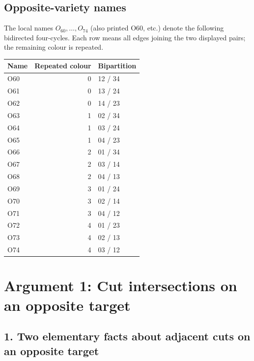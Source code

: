 \documentclass[
  10pt,
]{article}
\begin{document}
\hypertarget{opposite-variety-names}{%
\subsection{Opposite-variety names}\label{opposite-variety-names}}

The local names \(O_{60},\ldots,O_{74}\) (also printed O60, etc.) denote
the following bidirected four-cycles. Each row means all edges joining
the two displayed pairs; the remaining colour is repeated.

\begin{longtable}[]{@{}lrl@{}}
\toprule\noalign{}
Name & Repeated colour & Bipartition \\
\midrule\noalign{}
\endhead
\bottomrule\noalign{}
\endlastfoot
O60 & 0 & 12 / 34 \\
O61 & 0 & 13 / 24 \\
O62 & 0 & 14 / 23 \\
O63 & 1 & 02 / 34 \\
O64 & 1 & 03 / 24 \\
O65 & 1 & 04 / 23 \\
O66 & 2 & 01 / 34 \\
O67 & 2 & 03 / 14 \\
O68 & 2 & 04 / 13 \\
O69 & 3 & 01 / 24 \\
O70 & 3 & 02 / 14 \\
O71 & 3 & 04 / 12 \\
O72 & 4 & 01 / 23 \\
O73 & 4 & 02 / 13 \\
O74 & 4 & 03 / 12 \\
\end{longtable}

\hypertarget{arg-1}{%
\section{Argument 1: Cut intersections on an opposite
target}\label{arg-1}}

\hypertarget{two-elementary-facts-about-adjacent-cuts-on-an-opposite-target}{%
\subsection*{1. Two elementary facts about adjacent cuts on an opposite
target}\label{two-elementary-facts-about-adjacent-cuts-on-an-opposite-target}}
\end{document}
